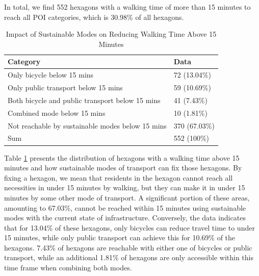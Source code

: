 In total, we find 552 hexagons with a walking time of more than 15 minutes to reach all POI categories, which is 30.98\% of all hexagons.
\begin{table}[h]
  \centering
  \caption{Impact of Sustainable Modes on Reducing Walking Time Above 15 Minutes}
  \label{table:hexagons_with_walking_time_above_15_minutes}
  \begin{tabular}{|l|l|}
    \hline
    \textbf{Category}                                          & \textbf{Data}                \\ \hline
    Only bicycle below 15 mins                                 & 72 (13.04\%)                 \\ \hline
    Only public transport below 15 mins                        & 59 (10.69\%)                 \\ \hline
    Both bicycle and public transport below 15 mins            & 41 (7.43\%)                  \\ \hline
    Combined mode below 15 mins                                & 10 (1.81\%)                  \\ \hline
    Not reachable by sustainable modes below 15 mins           & 370 (67.03\%)                \\ \hline
    Sum           & 552 (100\%)                \\ \hline
  \end{tabular}
\end{table}
Table \ref{table:hexagons_with_walking_time_above_15_minutes} presents the distribution of hexagons with a walking time above 15 minutes and how sustainable modes of transport can fix those hexagons.
By fixing a hexagon, we mean that residents in the hexagon cannot reach all necessities in under 15 minutes by walking, but they can make it in under 15 minutes by some other mode of transport.
A significant portion of these areas, amounting to 67.03\%, cannot be reached within 15 minutes using sustainable modes with the current state of infrastructure. 
Conversely, the data indicates that for 13.04\% of these hexagons, only bicycles can reduce travel time to under 15 minutes, while only public transport can achieve this for 10.69\% of the hexagons. 
7.43\% of hexagons are reachable with either one of bicycles or public transport, while an additional 1.81\% of hexagons are only accessible within this time frame when combining both modes. 


